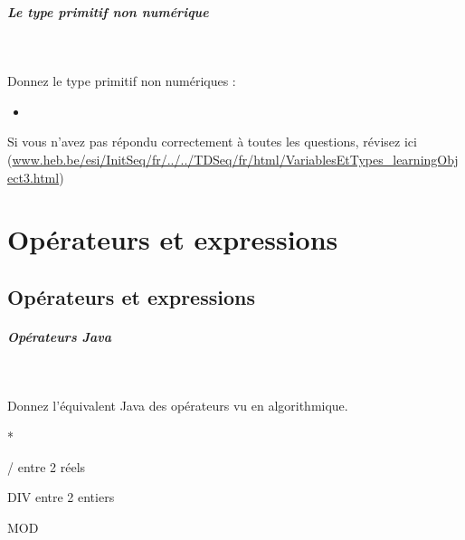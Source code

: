\documentclass[11pt,a4paper]{article}
\begin{document}
			
		\subparagraph{Le type primitif non num\'erique} 
		
                \textcolor{white}{.} \par
             
								Donnez le type primitif non num\'eriques :
							
					\begin{itemize}
				
			\item  \textcolor{gray}{\underline{\hspace*{5em}}} 
					\end{itemize}
				Si vous n'avez pas r\'epondu correctement \`a toutes les questions, 
          r\'evisez ici (\url{www.heb.be/esi/InitSeq/fr/../../TDSeq/fr/html/VariablesEtTypes\_learningObject3.html})
            \par
        \section{Op\'erateurs et expressions}\subsection{Op\'erateurs et expressions}
			
		\subparagraph{Op\'erateurs Java} 
		
                \textcolor{white}{.} \par
            
                  Donnez l'\'equivalent Java des op\'erateurs vu en algorithmique.
                
            \par
         
                *   \textcolor{gray}{\underline{\hspace*{1em}}} \par
				
                /   \textcolor{gray}{\underline{\hspace*{1em}}}  entre 2 r\'eels \par
				
                DIV   \textcolor{gray}{\underline{\hspace*{1em}}}  entre 2 entiers \par
				
                MOD   \textcolor{gray}{\underline{\hspace*{1em}}} \par
				
\end{document}
